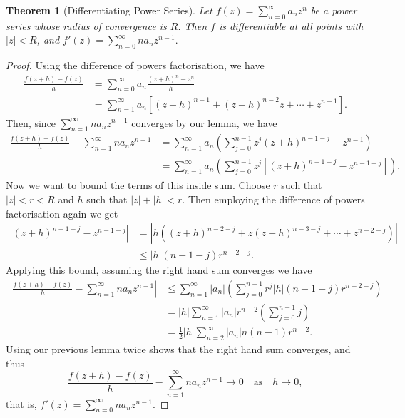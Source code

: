 \documentclass[11pt, a4paper]{article}
\newtheorem{theorem}{Theorem}[section]
\theoremstyle{definition}
\begin{document}
\begin{theorem}[Differentiating Power Series]
	Let $f(z) = \sum_{n = 0}^{\infty} a_n z^n$ be a power series whose radius of convergence is $R$. Then $f$ is differentiable at all points with $|z| < R$, and
	$
	f'(z) = \sum_{n = 0}^{\infty} n a_n z^{n - 1}.
	$
\end{theorem}
\begin{proof}
	Using the difference of powers factorisation, we have
	\begin{align*}
		\frac{f(z+h)-f(z)}{h}&=\sum_{n=0}^{\infty} a_{n} \frac{(z+h)^{n}-z^{n}}{h}\\&=\sum_{n=1}^{\infty} a_{n}\left[(z+h)^{n-1}+(z+h)^{n-2} z+\cdots+z^{n-1}\right].
	\end{align*}
	Then, since $\sum_{n = 1}^\infty n a_n z^{n - 1}$ converges by our lemma, we have
	\begin{align*}
		\frac{f(z+h)-f(z)}{h}-\sum_{n=1}^{\infty} n a_{n} z^{n-1} &= \sum_{n = 1}^{\infty} a_n \left(\sum_{j=0}^{n-1} z^{j}(z+h)^{n-1-j}-z^{n-1}\right) \\
		&= \sum_{n = 1}^{\infty} a_n \left(\sum_{j=0}^{n-1} z^{j}\left[(z+h)^{n-1-j}-z^{n-1 - j}\right]\right).
	\end{align*}
	Now we want to bound the terms of this inside sum. Choose $r$ such that $|z| < r < R$ and $h$ such that $|z| + |h| < r$. Then 
	employing the difference of powers factorisation again we get
	\begin{align*}
		|(z+h)^{n-1-j}-z^{n-1 - j}| &= |h((z + h)^{n - 2 - j} + z(z + h)^{n - 3 - j} + \cdots + z^{n - 2 - j})| \\
		&\leq |h|(n- 1 - j)r^{n - 2 - j}.
	\end{align*}
Applying this bound, assuming the right hand sum converges we have
\begin{align*}
	\left|\frac{f(z+h)-f(z)}{h}-\sum_{n=1}^{\infty} n a_{n} z^{n-1}\right| &\leq \sum_{n=1}^{\infty}\left|a_{n}\right|\left(\sum_{j=0}^{n-1} r^{j}|h|(n-1-j) r^{n-2-j}\right) \\
	&= |h| \sum_{n=1}^{\infty}\left|a_{n}\right| r^{n-2}\left(\sum_{j=0}^{n-1}j\right) \\
	&= \frac{1}{2}|h| \sum_{n=2}^{\infty}\left|a_{n}\right| n(n-1)r^{n-2}.
\end{align*}
Using our previous lemma twice shows that the right hand sum converges, and thus
$$
\frac{f(z+h)-f(z)}{h}-\sum_{n=1}^{\infty} n a_{n} z^{n-1} \rightarrow 0 \quad \text{as} \quad h \rightarrow 0,
$$
that is,
$
f'(z) = \sum_{n = 0}^{\infty} n a_n z^{n - 1}.
$
\end{proof}
\end{document}
